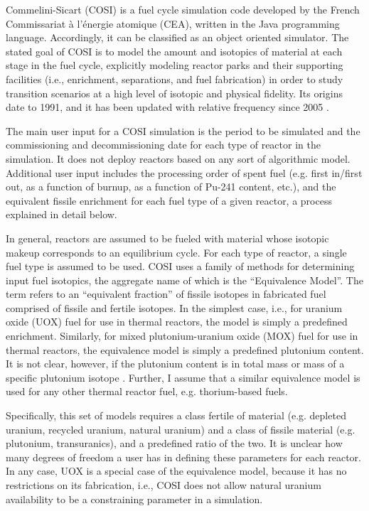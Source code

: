 Commelini-Sicart (COSI) is a fuel cycle simulation code developed by the French
Commissariat \`{a} l'\'{e}nergie atomique (CEA), written in the Java programming
language. Accordingly, it can be classified as an object oriented simulator. The
stated goal of COSI is to model the amount and isotopics of material at each
stage in the fuel cycle, explicitly modeling reactor parks and their supporting
facilities (i.e., enrichment, separations, and fuel fabrication) in order to
study transition scenarios at a high level of isotopic and physical
fidelity. Its origins date to 1991, and it has been updated with relative
frequency since 2005 \cite{boucher_cosi_2005,boucher_cosi:_2006,meyer_new_2009,
coquelet-pascal_validation_2011}.

The main user input for a COSI simulation is the period to be simulated and the
commissioning and decommissioning date for each type of reactor in the
simulation. It does not deploy reactors based on any sort of algorithmic
model. Additional user input includes the processing order of spent fuel
(e.g. first in/first out, as a function of burnup, as a function of Pu-241
content, etc.), and the equivalent fissile enrichment for each fuel type of a
given reactor, a process explained in detail below.

In general, reactors are assumed to be fueled with material whose isotopic
makeup corresponds to an equilibrium cycle. For each type of reactor, a single
fuel type is assumed to be used. COSI uses a family of methods for determining
input fuel isotopics, the aggregate name of which is the ``Equivalence
Model''. The term refers to an ``equivalent fraction'' of fissile isotopes in
fabricated fuel comprised of fissile and fertile isotopes. In the simplest case,
i.e., for uranium oxide (UOX) fuel for use in thermal reactors, the model is
simply a predefined enrichment.  Similarly, for mixed plutonium-uranium oxide
(MOX) fuel for use in thermal reactors, the equivalence model is simply a
predefined plutonium content. It is not clear, however, if the plutonium content
is in total mass or mass of a specific plutonium isotope \cite{meyer_new_2009,
coquelet-pascal_validation_2011}. Further, I assume that a similar equivalence
model is used for any other thermal reactor fuel, e.g. thorium-based
fuels. 

Specifically, this set of models requires a class fertile of material
(e.g. depleted uranium, recycled uranium, natural uranium) and a class of
fissile material (e.g. plutonium, transuranics), and a predefined ratio of the
two. It is unclear how many degrees of freedom a user has in defining these
parameters for each reactor. In any case, UOX is a special case of the
equivalence model, because it has no restrictions on its fabrication, i.e., COSI
does not allow natural uranium availability to be a constraining parameter in a
simulation.

